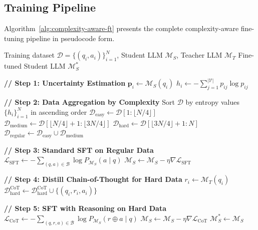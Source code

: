 \subsection{Training Pipeline}

Algorithm~\ref{alg:complexity-aware-ft} presents the complete complexity-aware fine-tuning pipeline in pseudocode form.

\begin{algorithm}[!htb]
\caption{Complexity-Aware Fine-Tuning Pipeline}
\label{alg:complexity-aware-ft}
\begin{algorithmic}[1]
\REQUIRE Training dataset $\mathcal{D} = \{(q_i, a_i)\}_{i=1}^{N}$, Student LLM $\mathcal{M}_S$, Teacher LLM $\mathcal{M}_T$
\ENSURE Fine-tuned Student LLM $\mathcal{M}_S^*$

\STATE \textbf{// Step 1: Uncertainty Estimation}
    \STATE $\mathbf{p}_i \gets \mathcal{M}_S(q_i)$ 
    \STATE $h_i \gets -\sum_{j=1}^{|\mathcal{V}|} p_{ij} \log p_{ij}$ 
\ENDFOR

\STATE \textbf{// Step 2: Data Aggregation by Complexity}
\STATE Sort $\mathcal{D}$ by entropy values $\{h_i\}_{i=1}^{N}$ in ascending order
\STATE $\mathcal{D}_{\text{easy}} \gets \mathcal{D}[1 : \lfloor N/4 \rfloor]$
\STATE $\mathcal{D}_{\text{medium}} \gets \mathcal{D}[\lfloor N/4 \rfloor + 1 : \lfloor 3N/4 \rfloor]$
\STATE $\mathcal{D}_{\text{hard}} \gets \mathcal{D}[\lfloor 3N/4 \rfloor + 1 : N]$
\STATE $\mathcal{D}_{\text{regular}} \gets \mathcal{D}_{\text{easy}} \cup \mathcal{D}_{\text{medium}}$

\STATE \textbf{// Step 3: Standard SFT on Regular Data}
        \STATE $\mathcal{L}_{\text{SFT}} \gets -\sum_{(q,a) \in \mathcal{B}} \log P_{\mathcal{M}_S}(a \mid q)$
        \STATE $\mathcal{M}_S \gets \mathcal{M}_S - \eta \nabla \mathcal{L}_{\text{SFT}}$
    \ENDFOR
\ENDFOR

\STATE \textbf{// Step 4: Distill Chain-of-Thought for Hard Data}
    \STATE $r_i \gets \mathcal{M}_T(q_i)$ 
    \STATE $\mathcal{D}_{\text{hard}}^{\text{CoT}} \gets \mathcal{D}_{\text{hard}}^{\text{CoT}} \cup \{(q_i, r_i, a_i)\}$
\ENDFOR

\STATE \textbf{// Step 5: SFT with Reasoning on Hard Data}
        \STATE $\mathcal{L}_{\text{CoT}} \gets -\sum_{(q,r,a) \in \mathcal{B}} \log P_{\mathcal{M}_S}(r \oplus a \mid q)$
        \STATE $\mathcal{M}_S \gets \mathcal{M}_S - \eta \nabla \mathcal{L}_{\text{CoT}}$
    \ENDFOR
\ENDFOR
\RETURN $\mathcal{M}_S^* \gets \mathcal{M}_S$
\end{algorithmic}
\end{algorithm}

